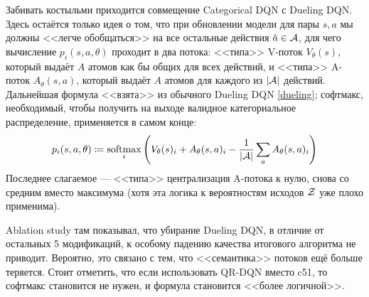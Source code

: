 Забивать костыльми приходится совмещение Categorical DQN с Dueling DQN. Здесь остаётся только идея о том, что при обновлении модели для пары $s, a$ мы должны <<легче обобщаться>> на все остальные действия $\hat{a} \in \mathcal{A}$, для чего вычисление $p_i(s, a, \theta)$ проходит в два потока: <<типа>> V-поток $V_{\theta}(s)$, который выдаёт $A$ атомов как бы общих для всех действий, и <<типа>> A-поток $A_{\theta}(s, a)$, который выдаёт $A$ атомов для каждого из $|\mathcal{A}|$ действий. Дальнейшая формула <<взята>> из обычного Dueling DQN \eqref{dueling}; софтмакс, необходимый, чтобы получить на выходе валидное категориальное распределение, применяется в самом конце:
\begin{equation}\label{rainbowdueling}
p_i(s, a, \theta) \coloneqq \operatorname*{softmax}\limits_{i} \left( V_{\theta}(s)_i + A_{\theta}(s, a)_i - \frac{1}{|\mathcal{A}|}\sum_a A_{\theta}(s, a)_i \right)
\end{equation}
Последнее слагаемое --- <<типа>> централизация A-потока к нулю, снова со средним вместо максимума (хотя эта логика к вероятностям исходов $\mathcal{Z}$ уже плохо применима).

\begin{remark}
Ablation study там показывал, что убирание Dueling DQN, в отличие от остальных 5 модификаций, к особому падению качества итогового алгоритма не приводит. Вероятно, это связано с тем, что <<семантика>> потоков ещё больше теряется. Стоит отметить, что если использовать QR-DQN вместо c51, то софтмакс становится не нужен, и формула становится <<более логичной>>.
\end{remark}

